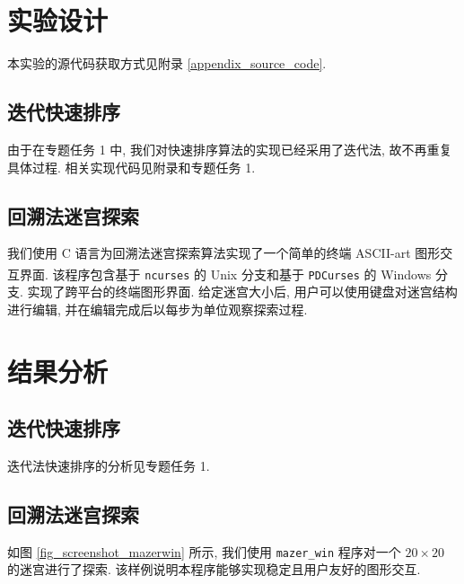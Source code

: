 \documentclass[a4paper]{article}
\begin{document}
\section{实验设计}

本实验的源代码获取方式见附录 \ref{appendix_source_code}.

\subsection{迭代快速排序}

由于在专题任务 1 中, 我们对快速排序算法的实现已经采用了迭代法, 故不再重复具体过程. 相关实现代码见附录和专题任务 1.

\subsection{回溯法迷宫探索}

我们使用 C 语言为回溯法迷宫探索算法实现了一个简单的终端 ASCII-art 图形交互界面. 该程序包含基于 \texttt{ncurses} \cite{bib_ncurses} 的 Unix\textsuperscript{\textregistered} 分支和基于 \texttt{PDCurses} \cite{bib_pdcurses} 的 Windows\textsuperscript{\textregistered} 分支. 实现了跨平台的终端图形界面. 给定迷宫大小后, 用户可以使用键盘对迷宫结构进行编辑, 并在编辑完成后以每步为单位观察探索过程.

\section{结果分析}

\subsection{迭代快速排序}

迭代法快速排序的分析见专题任务 1.

\subsection{回溯法迷宫探索}

如图 \ref{fig_screenshot_mazerwin} 所示, 我们使用 \texttt{mazer\_win} 程序对一个 $20 \times 20$ 的迷宫进行了探索. 该样例说明本程序能够实现稳定且用户友好的图形交互.
\end{document}
